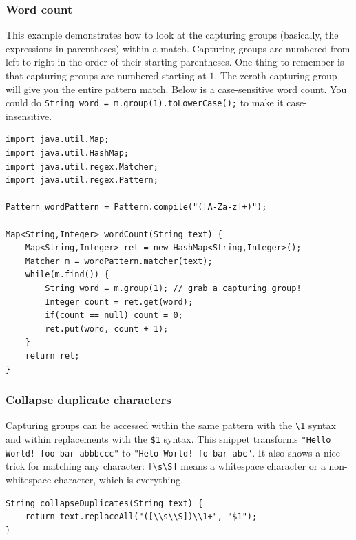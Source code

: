 \documentclass[a4paper,12pt]{article}
\begin{document}
\subsubsection{Word count}
This example demonstrates how to look at the capturing groups (basically, the expressions in parentheses) within a match. Capturing groups are numbered from left to right in the order of their starting parentheses. One thing to remember is that capturing groups are numbered starting at $1$. The zeroth capturing group will give you the entire pattern match. Below is a case-sensitive word count. You could do \lstinline/String word = m.group(1).toLowerCase();/ to make it case-insensitive.
\begin{lstlisting}
import java.util.Map;
import java.util.HashMap;
import java.util.regex.Matcher;
import java.util.regex.Pattern;

Pattern wordPattern = Pattern.compile("([A-Za-z]+)");

Map<String,Integer> wordCount(String text) {
	Map<String,Integer> ret = new HashMap<String,Integer>();
	Matcher m = wordPattern.matcher(text);
	while(m.find()) {
		String word = m.group(1); // grab a capturing group!
		Integer count = ret.get(word);
		if(count == null) count = 0;
		ret.put(word, count + 1);
	}
	return ret;
}
\end{lstlisting}

\subsubsection{Collapse duplicate characters}
Capturing groups can be accessed within the same pattern with the \lstinline/\1/ syntax and within replacements with the \lstinline/$1/ syntax. This snippet transforms \lstinline/"Hello World! foo bar abbbccc"/ to \lstinline/"Helo World! fo bar abc"/. It also shows a nice trick for matching any character: \lstinline/[\s\S]/ means a whitespace character or a non-whitespace character, which is everything.
\begin{lstlisting}
String collapseDuplicates(String text) {
	return text.replaceAll("([\\s\\S])\\1+", "$1");
}
\end{lstlisting}
\end{document}
